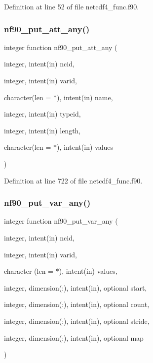 Definition at line 52 of file netcdf4\+\_\+func.\+f90.

\mbox{\label{netcdf4__func_8f90_aaac10ca101f16e1075daa5d58915d40d}} 
\subsubsection{\texorpdfstring{nf90\+\_\+put\+\_\+att\+\_\+any()}{nf90\_put\_att\_any()}}
{\footnotesize\ttfamily integer function nf90\+\_\+put\+\_\+att\+\_\+any (\begin{DoxyParamCaption}\item[{integer, intent(in)}]{ncid,  }\item[{integer, intent(in)}]{varid,  }\item[{character(len = $\ast$), intent(in)}]{name,  }\item[{integer, intent(in)}]{typeid,  }\item[{integer, intent(in)}]{length,  }\item[{character(len = $\ast$), intent(in)}]{values }\end{DoxyParamCaption})}



Definition at line 722 of file netcdf4\+\_\+func.\+f90.

\mbox{\label{netcdf4__func_8f90_ac5893a145b81bbd8920c99a7193c8af8}} 
\subsubsection{\texorpdfstring{nf90\+\_\+put\+\_\+var\+\_\+any()}{nf90\_put\_var\_any()}}
{\footnotesize\ttfamily integer function nf90\+\_\+put\+\_\+var\+\_\+any (\begin{DoxyParamCaption}\item[{integer, intent(in)}]{ncid,  }\item[{integer, intent(in)}]{varid,  }\item[{character (len = $\ast$), intent(in)}]{values,  }\item[{integer, dimension(\+:), intent(in), optional}]{start,  }\item[{integer, dimension(\+:), intent(in), optional}]{count,  }\item[{integer, dimension(\+:), intent(in), optional}]{stride,  }\item[{integer, dimension(\+:), intent(in), optional}]{map }\end{DoxyParamCaption})}



